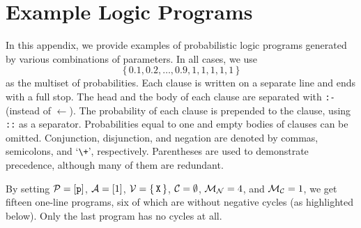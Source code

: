 \chapter{Example Logic Programs}

In this appendix, we provide examples of probabilistic logic programs generated
by various combinations of parameters. In all cases, we use
\[
  \{\, 0.1, 0.2, \dots, 0.9, 1, 1, 1, 1, 1 \,\}
\]
as the multiset of probabilities. Each clause is written on a separate line and
ends with a full stop. The head and the body of each clause are separated with
\texttt{:-} (instead of $\gets$). The probability of each clause is prepended to
the clause, using \texttt{::} as a separator. Probabilities equal to one and
empty bodies of clauses can be omitted. Conjunction, disjunction, and negation
are denoted by commas, semicolons, and `\texttt{\textbackslash+}', respectively.
Parentheses are used to demonstrate precedence, although many of them are
redundant.

By setting $\mathcal{P}{} = [\texttt{p}]$, $\mathcal{A}{} = [1]$, $\mathcal{V}{} =
\{\, \texttt{X} \,\}$, $\mathcal{C}{} = \emptyset$, $\mathcal{M}_{\mathcal{N}}{} = 4$, and
$\mathcal{M}_{\mathcal{C}}{} = 1$, we get fifteen one-line programs, six of which are
without negative cycles (as highlighted below). Only the last program has no
cycles at all.

